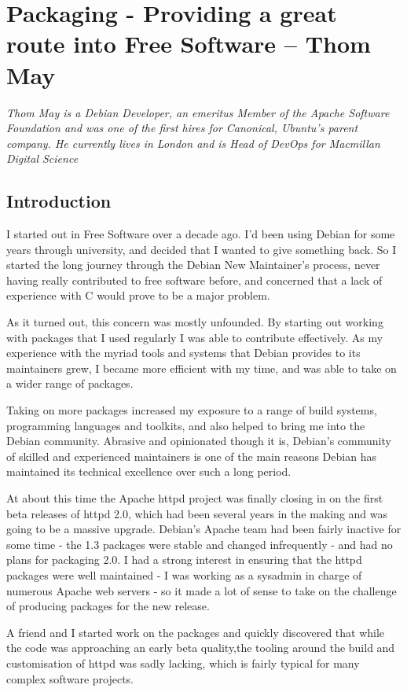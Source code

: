 \chapter{Packaging - Providing a great route into Free Software -- Thom May}

\textit{Thom May is a Debian Developer, an emeritus Member of the Apache Software Foundation and was one of the first hires for Canonical, Ubuntu's parent company. He currently lives in London and is Head of DevOps for Macmillan Digital Science}

\section*{Introduction}
I started out in Free Software over a decade ago. I'd been using Debian for some years through university, and decided that I wanted to give something back. So I started the long journey through the Debian New Maintainer's process, never having really contributed to free software before, and concerned that a lack of experience with C would prove to be a major problem.

As it turned out, this concern was mostly unfounded. By starting out working with packages that I used regularly I was able to contribute effectively. As my experience with the myriad tools and systems that Debian provides to its maintainers grew, I became more efficient with my time, and was able to take on a wider range of packages. 

Taking on more packages increased my exposure to a range of build systems, programming languages and toolkits, and also helped to bring me into the Debian community. Abrasive and opinionated though it is, Debian's community of skilled and experienced maintainers is one of the main reasons Debian has maintained its technical excellence over such a long period.

At about this time the Apache httpd project was finally closing in on the first beta releases of httpd 2.0, which had been several years in the making and was going to be a massive upgrade. Debian's Apache team had been fairly inactive for some time - the 1.3 packages were stable and changed infrequently - and had no plans for packaging 2.0. 
I had a strong interest in ensuring that the httpd packages were well maintained - I was working as a sysadmin in charge of numerous Apache web servers - so it made a lot of sense to take on the challenge of producing packages for the new release. 

A friend and I started work on the packages and quickly discovered that while the code was approaching an early beta quality,the tooling around the build and customisation of httpd was sadly lacking, which is fairly typical for many complex software projects. 

